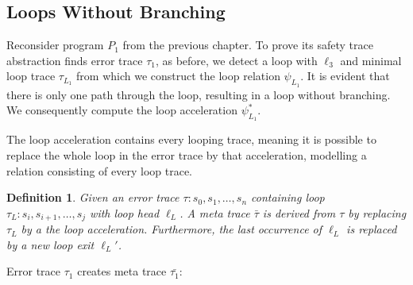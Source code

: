 \documentclass{article}
\newtheorem{mydef}{Definition}
\begin{document}
\subsection{Loops Without Branching}

Reconsider program $P_1$ from the previous chapter. To prove its safety trace abstraction finds error trace $\tau_1$, as before, we detect a loop with  $\ell_3$ and minimal loop trace $\tau_{L_1}$ from which we construct the loop relation $\psi_{L_1}$. It is evident that there is only one path through the loop, resulting in a loop without branching. We consequently compute the loop acceleration $\psi^*_{L_1}$. \par

The loop acceleration contains every looping trace, meaning it is possible to replace the whole loop in the error trace by that acceleration, modelling a relation consisting of every loop trace.

\begin{mydef}
    Given an error trace $\tau: s_0, s_1, \ldots, s_n$ containing loop $\tau_L: s_i, s_{i+1}, \ldots, s_j$ with loop head $\ell_L$. A meta trace $\bar{\tau}$ is derived from $\tau$ by replacing $\tau_L$ by a the loop acceleration. Furthermore, the last occurrence of $\ell_L$ is replaced by a new loop exit $\ell_L'$.
\end{mydef}

Error trace $\tau_1$ creates meta trace $\bar{\tau_1}$:


\begin{figure}[H]
\end{figure}
\end{document}
